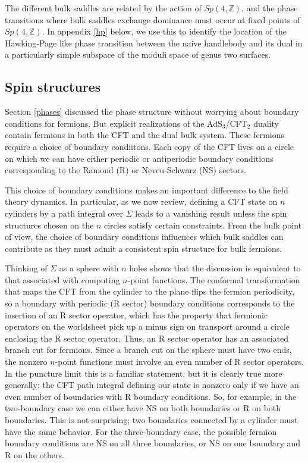 \documentclass[12pt]{article}
\newcommand{\ZZ}{\mathbb{Z}} %
\numberwithin{equation}{section}
\begin{document}
 The different bulk saddles are related by the action of $Sp(4,\ZZ)$, and the phase transitions where bulk saddles exchange dominance must occur at fixed points of $Sp(4,\ZZ)$. In appendix \ref{hp} below, we use this to identify the location of the Hawking-Page like phase transition between the naive handlebody and its dual in a particularly simple subspace of the moduli space of genus two surfaces.

\subsection{Spin structures}
\label{spins}

Section \ref{phases} discussed the phase structure without worrying about boundary conditions for fermions. But explicit realizations of the AdS$_3$/CFT$_2$ duality contain fermions in both the CFT and the dual bulk system. These fermions require a choice of boundary condiitons.  Each copy of the CFT lives on a circle on which we can have either periodic or antiperiodic boundary conditions corresponding to the Ramond (R) or Neveu-Schwarz (NS) sectors.

This choice of boundary conditions makes an important difference to the field theory dynamics.  In particular, as we now review, defining a CFT state on $n$ cylinders by a path integral over $\Sigma$ leads to a vanishing result unless the spin structures chosen on the $n$ circles satisfy certain constraints.  From the bulk point of view, the choice of boundary conditions influences which bulk saddles can contribute as they must admit a consistent spin structure for bulk fermions.



Thinking of $\Sigma$ as a sphere with $n$ holes shows that the discussion is equivalent to that associated with computing $n$-point functions.  The conformal transformation that maps the CFT from the cylinder to the plane flips the fermion periodicity, so a boundary with periodic (R sector) boundary conditions corresponds to the insertion of an R sector operator, which has the property that fermionic operators on the worldsheet pick up a minus sign on transport around a circle enclosing the R sector operator. Thus, an R sector operator has an associated  branch cut for fermions.  Since a branch cut on the sphere must have two ends, the nonzero $n$-point functions must involve an even number of R sector operators.  In the puncture limit this is a familiar statement, but it is clearly true more generally: the CFT path integral defining our state is nonzero only if we have an even number of boundaries with R boundary conditions. So, for example, in the two-boundary case we can either have NS on both boundaries or R on both boundaries.  This is not surprising; two boundaries connected by a cylinder must have the same behavior. For the three-boundary case, the possible fermion boundary conditions are NS on all three boundaries, or NS on one boundary and R on the others.
\end{document}
